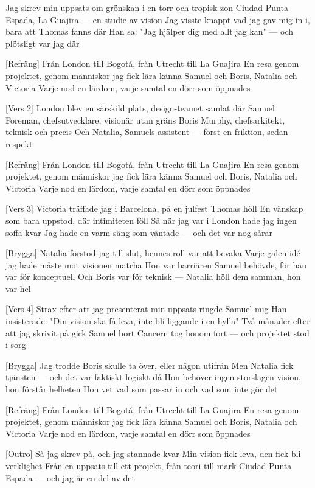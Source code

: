 \begin{lyrics}
[Vers 1]
Jag skrev min uppsats om grönskan i en torr och tropisk zon
Ciudad Punta Espada, La Guajira — en studie av vision
Jag visste knappt vad jag gav mig in i, bara att Thomas fanns där
Han sa: "Jag hjälper dig med allt jag kan" — och plötsligt var jag där

[Refräng]
Från London till Bogotá, från Utrecht till La Guajira
En resa genom projektet, genom människor jag fick lära känna
Samuel och Boris, Natalia och Victoria
Varje nod en lärdom, varje samtal en dörr som öppnades

[Vers 2]
London blev en särskild plats, design-teamet samlat där
Samuel Foreman, chefsutvecklare, visionär utan gräns
Boris Murphy, chefsarkitekt, teknisk och precis
Och Natalia, Samuels assistent — först en friktion, sedan respekt

[Refräng]
Från London till Bogotá, från Utrecht till La Guajira
En resa genom projektet, genom människor jag fick lära känna
Samuel och Boris, Natalia och Victoria
Varje nod en lärdom, varje samtal en dörr som öppnades

[Vers 3]
Victoria träffade jag i Barcelona, på en julfest Thomas höll
En vänskap som bara uppstod, där intimiteten föll
Så när jag var i London hade jag ingen soffa kvar
Jag hade en varm säng som väntade — och det var nog sårar

[Brygga]
Natalia förstod jag till slut, hennes roll var att bevaka
Varje galen idé jag hade måste mot visionen matcha
Hon var barriären Samuel behövde, för han var för konceptuell
Och Boris var för teknisk — Natalia höll dem samman, hon var hel

[Vers 4]
Strax efter att jag presenterat min uppsats ringde Samuel mig
Han insisterade: "Din vision ska få leva, inte bli liggande i en hylla"
Två månader efter att jag skrivit på gick Samuel bort
Cancern tog honom fort — och projektet stod i sorg

[Brygga]
Jag trodde Boris skulle ta över, eller någon utifrån
Men Natalia fick tjänsten — och det var faktiskt logiskt då
Hon behöver ingen storslagen vision, hon förstår helheten
Hon vet vad som passar in och vad som inte gör det

[Refräng]
Från London till Bogotá, från Utrecht till La Guajira
En resa genom projektet, genom människor jag fick lära känna
Samuel och Boris, Natalia och Victoria
Varje nod en lärdom, varje samtal en dörr som öppnades

[Outro]
Så jag skrev på, och jag stannade kvar
Min vision fick leva, den fick bli verklighet
Från en uppsats till ett projekt, från teori till mark
Ciudad Punta Espada — och jag är en del av det
\end{lyrics}

